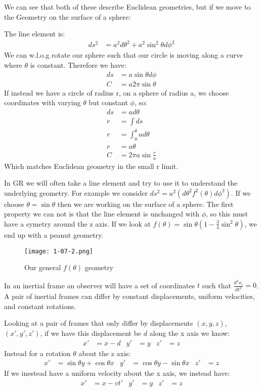 We can see that both of these describe Euclidean geometries, but if we move to the Geometry on the surface of a sphere:

The line element is:
\begin{align*}
	ds^2 &= a^2 d\theta^2 + a^2\sin^2\theta d\phi^2
\end{align*}
We can w.l.o.g rotate our sphere such that our circle is moving along a curve where $\theta$ is constant. Therefore we have:
\begin{align*}
	ds &= a\sin\theta d\phi \\
	C &= a2\pi \sin\theta
\end{align*}
If instead we have a circle of radius r, on a sphere of radius a, we choose coordinates with varying $\theta$ but constant $\phi$, so:
\begin{align*}
	ds &= ad\theta \\
	r &= \int ds \\
	r &= \int _0^\theta ad\theta \\
	r &= a\theta \\
	C &= 2\pi a \sin \frac{r}{a}
\end{align*}
Which matches Euclidean geometry in the small r limit.

In GR we will often take a line element and try to use it to understand the underlying geometry. For example we consider $ds^2 = a^2(d\theta^2 f^2(\theta) d\phi^2)$. If we choose $\theta = \sin\theta$ then we are working on the surface of a sphere.
The first property we can not is that the line element is unchanged with $\phi$, so this must have a symetry around the z axis. If we look at $f(\theta) = \sin\theta(1-\frac{3}{4}\sin^2\theta)$, we end up with a peanut geometry.
\begin{figure*}[h]
	\centering
	\texttt{[image: 1-07-2.png]}
	\caption*{Our general $f(\theta)$ geometry}
\end{figure*}

In an inertial frame an observer will have a set of coordinates $t$ such that $\frac{d^2x_i}{dt^2}=0$. A pair of inertial frames can differ by constant displacements, uniform velocities, and constant rotations.

Looking at a pair of frames that only differ by displacements $(x,y,z)$, $(x',y',z')$, if we have this displacement be $d$ along the x axis we know:
\begin{align*}
	x' &= x-d & y'&= y & z' &= z
\end{align*}
Instead for a rotation $\theta$ about the z axis:
\begin{align*}
	x' &= \sin\theta y + \cos\theta x &
	y' &= \cos\theta y - \sin \theta x &
	z' &= z
\end{align*}
If we inestead have a uniform velocity about the x axis, we instead have:
\begin{align*}
	x' &= x -vt' &
	y' &= y &
	z' &= z
\end{align*}

